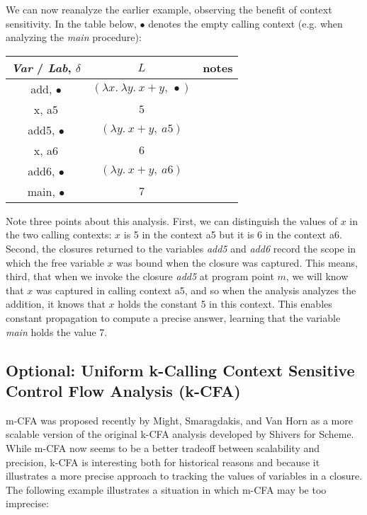 \documentclass[11pt]{article}
\begin{document}

We can now reanalyze the earlier example, observing the benefit of context sensitivity.  In the table below, $\bullet$ denotes the empty calling context (e.g. when analyzing the \textit{main} procedure):

\tablespace
\begin{tabular}{c | c | l}

\textit{Var} / \textit{Lab}, $\delta$ & $L$ & notes \\
\hline
add, $\bullet$  & $(\lambda x .~ \lambda y .~ x + y,~ \bullet)$ \\
x, a5           & $5$ \\
add5, $\bullet$ & $(\lambda y .~ x + y,~a5)$ \\
x, a6           & $6$ \\
add6, $\bullet$ & $(\lambda y .~ x + y,~a6)$ \\
main, $\bullet$ & $7$ \\

\end{tabular}
\tablespace

Note three points about this analysis.  First, we can distinguish the values of $x$ in the two calling contexts: $x$ is 5 in the context a5 but it is 6 in the context a6.  Second, the closures returned to the variables \textit{add5} and \textit{add6} record the scope in which the free variable $x$ was bound when the closure was captured.  This means, third, that when we invoke the closure \textit{add5} at program point $m$, we will know that $x$ was captured in calling context a5, and so when the analysis analyzes the addition, it knows that $x$ holds the constant 5 in this context.  This enables constant propagation to compute a precise answer, learning that the variable \textit{main} holds the value 7.



\subsection*{Optional: Uniform k-Calling Context Sensitive Control Flow Analysis (k-CFA)}

m-CFA was proposed recently by Might, Smaragdakis, and Van Horn as a more scalable version of the original k-CFA analysis developed by Shivers for Scheme.  While m-CFA now seems to be a better tradeoff between scalability and precision, k-CFA is interesting both for historical reasons and because it illustrates a more precise approach to tracking the values of variables in a closure.
%
The following example illustrates a situation in which m-CFA may be too imprecise:
\end{document}
